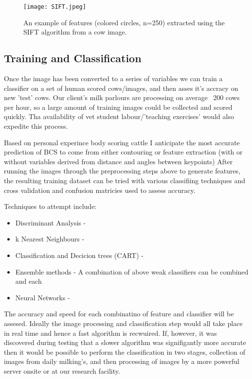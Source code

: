 \documentclass[11pt]{article}
\begin{document}
	\begin{figure}[h!]
		\centering
		\texttt{[image: SIFT.jpeg]}
		\caption{An example of features (colored circles, n=250) extracted  using the SIFT algorithm from a cow image.}
	\end{figure}


\subsection{Training and Classification}
	Once the image has been converted to a series of variables we can train a classifier on a set of human scored cows/images, and then asses it's accracy on new 'test' cows.
	Our client's milk parlours are processing on average ~200 cows per hour, so a large amount of training images could be collected and scored quickly. 
	Tha availability of vet student labour/'teaching exercises' would also expedite this process.


	Based on personal experince body scoring cattle I anticipate the most accurate prediction of BCS to come from either contouring or feature extraction (with or without variables derived from distance and angles between keypoints)
	After running the images through the preprocessing steps above to generate features, the resulting training dataset can be tried with various classifiing techniques and cross validation and confusion matricies used to assess accuracy.


	Techniques to attempt include: 

	\begin{itemize}
		\item Discriminant Analysis - 
		\item k Nearest Neighbours - 
		\item Classification and Decicion trees (CART) - 
		\item Ensemble methods - A combination of above weak classifiers can be combined and each 
		\item Neural Networks - 
	\end{itemize}

	The accuracy and speed for each combinatino of feature and classifier will be assesed.
	Ideally the image processing and classification step would all take place in real time and hence a fast algorithm is recwuired. 
	If, however, it was discovered during testing that a slower algorithm was signifigantly more accurate then it would be possible to perform the classification in two stages, collection of images from daily milking's, and then processing of images by a more powerful server onsite or at our research facility. 
\end{document}
